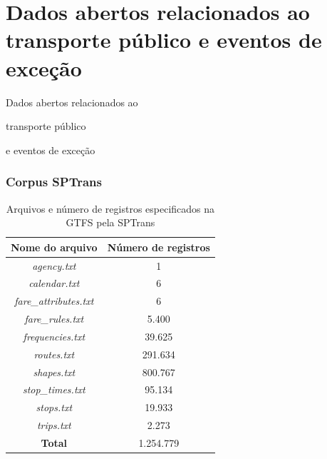 \documentclass{beamer}
\begin{document}
\section{Dados abertos relacionados ao transporte público e eventos de exceção}
\begin{frame}
\Huge{\centerline{Dados abertos relacionados ao}}
\Huge{\centerline{transporte público}}
\Huge{\centerline{e eventos de exceção}}
\end{frame}
\begin{frame}
\frametitle{Corpus SPTrans}
\begin{table}[!htb]
\centering
\caption{Arquivos e número de registros especificados na GTFS pela SPTrans}
	\label{tab:gtfs}
\begin{tabular}{c|c}
\toprule
\textbf{Nome do arquivo} & \textbf{Número de registros} \\ 
\midrule
\textit{agency.txt} & 1 \\ 
\hline
\textit{calendar.txt} & 6 \\ 
\hline
\textit{fare\_attributes.txt} & 6 \\ 
\hline
\textit{fare\_rules.txt} & 5.400 \\
\hline
\textit{frequencies.txt} & 39.625 \\
\hline
\textit{routes.txt} & 291.634 \\
\hline
\textit{shapes.txt} & 800.767 \\
\hline
\textit{stop\_times.txt} & 95.134 \\  
\hline
\textit{stops.txt} & 19.933 \\ 
\hline
\textit{trips.txt} & 2.273 \\
\midrule
\midrule
\textbf{\alert{Total}} & \alert{1.254.779} \\
\bottomrule
\end{tabular}
\end{table}
\end{frame}
\end{document}
